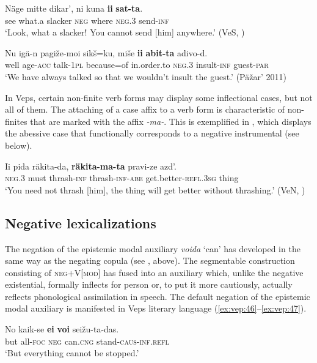 \documentclass[output=paper,colorlinks=true, citecolor=brown]{langscibook}
\begin{document}
\ea
    \label{ex:vep:43}
    \gll Näge  mitte  dikar’,  ni  kuna  \textbf{ii} \textbf{sat{}-ta}.\\
         see what.a slacker  \textsc{neg}  where \textsc{neg.3} send-\textsc{inf}\\
    \glt ‘Look, what a slacker! You cannot send [him] anywhere.’ (VeS, \citealt[485]{MSFOu86})
\z

\ea
    \label{ex:vep:44}
    \gll Nu igä{}-n  pagiže{}-moi  sikš=ku, miše \textbf{ii} \textbf{abit{}-ta} adivo{}-d.\\
         well  age-\textsc{acc} talk-\textsc{1pl} because=of in.order.to  \textsc{neg.3} insult-\textsc{inf} guest-\textsc{par}\\
    \glt ‘We have always talked so that we wouldn’t insult the guest.’ (Päžar’ 2011)
\z

In Veps, certain non-finite verb forms may display some inflectional cases, but not all of them.
The attaching of a case affix to a verb form is characteristic of non-finites that are marked with the affix \textit{{}-ma{}-}. This is exemplified in , which displays the abessive case that functionally corresponds to a negative instrumental (see  below).

\ea\label{ex:vep:45}
    \gll Ii pida räkita-da, \textbf{räkita-ma-ta} pravi-ze   azd'.\\
         \textsc{neg.3} must thrash-\textsc{inf} thrash-\textsc{inf-abe} get.better-\textsc{refl.3sg} thing\\
    \glt ‘You need not thrash [him], the thing will get better without thrashing.’ (VeN, \citealt[500]{MSFOu86})
\z 
         
\subsection{Negative lexicalizations}\label{sec:vep:2.5}
The negation of the epistemic modal auxiliary \textit{voida} ‘can’ has developed in the same way as the negating copula (see , above). The segmentable construction consisting of \textsc{neg}+V[\textsc{mod}] has fused into an auxiliary which, unlike the negative existential, formally inflects for person or, to put it more cautiously, actually reflects phonological assimilation in speech. The default negation of the epistemic modal auxiliary is manifested in Veps literary language (\ref{ex:vep:46}–\ref{ex:vep:47}).

\ea
    \label{ex:vep:46}
    \gll No kaik-se \textbf{ei} \textbf{voi} seižu{}-ta{}-das.\\
         but  all-\textsc{foc} \textsc{neg} can.\textsc{cng} stand-\textsc{caus{}-inf.refl}\\
    \glt ‘But everything cannot be stopped.’
\z 
\end{document}
